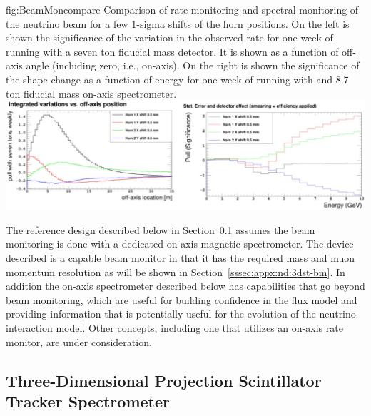 \begin{dunefigure}{fig:BeamMoncompare}
{Comparison of rate monitoring and spectral monitoring of the neutrino beam for a few 1-sigma shifts of the horn positions.  On the left is shown the significance of the variation in the observed rate for one week of running with a seven ton fiducial mass detector.  It is shown as a function of off-axis angle (including zero, i.e., on-axis). On the right is shown the significance of the shape change as a function of energy for one week of running with and 8.7 ton fiducial mass on-axis spectrometer.}
  \includegraphics[width=7.in]{graphics/BeamMonitoringplots_3.jpg}
\end{dunefigure}

The reference design described below in Section~\ref{sec:appx-nd:mpt-3dst} assumes the beam monitoring is done with a dedicated on-axis magnetic spectrometer.  The device described is a capable beam monitor in that it has the required mass and muon momentum resolution as will be shown in Section~\ref{sssec:appx:nd:3dst-bm}.  In addition the on-axis spectrometer described below has capabilities that go beyond beam monitoring, which are useful for building confidence in the flux model and providing information that is potentially useful for the evolution of the neutrino interaction model.  Other concepts, including one that utilizes an on-axis rate monitor, are under consideration.


\subsection{Three-Dimensional Projection Scintillator Tracker Spectrometer}
\label{sec:appx-nd:mpt-3dst}

